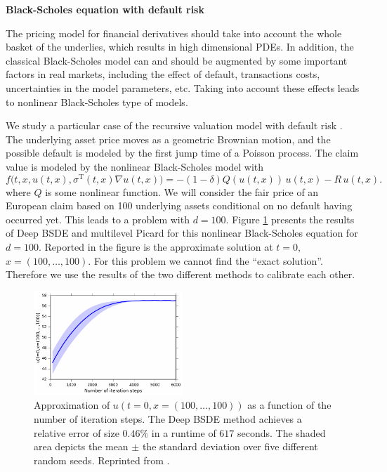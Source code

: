 \documentclass[12pt]{article}
\theoremstyle{definition}
\begin{document}
\vspace{.1in}
\noindent
{\bf Black-Scholes equation with default risk}

 The pricing model for financial derivatives  should take into account the whole basket of the underlies, which results in high dimensional PDEs.  In addition, 
the classical Black-Scholes model can and should be augmented by some important factors in real markets, including the 
 effect of default, transactions costs, uncertainties in the model parameters, etc.
 Taking into account these effects leads to nonlinear Black-Scholes type of models.
%

  We study a particular case of the recursive valuation model with default risk \cite{Duffie1996, Bender2017}. 
 The underlying asset price moves as a geometric Brownian motion, and the possible default is modeled by the first jump time of a Poisson process.
 The claim value is modeled by the nonlinear Black-Scholes model with
    \begin{equation}
      f\big( t, x, u(t,x), \sigma^{\operatorname{T}}( t, x ) \nabla u( t, x ) \big)
      = - \left( 1 - \delta \right) Q( u(t,x) ) \, u(t,x) - R \, u(t,x).
    \end{equation}
where $Q$ is some nonlinear function. %
We will consider the fair price of an European claim based on 100 underlying assets
    conditional on no default having occurred yet.  This leads to a problem with $d=100$.
Figure \ref{fig:BlackScholes} presents the results of Deep BSDE and multilevel Picard for this nonlinear Black-Scholes equation
for $d=100$.
Reported in the figure is the approximate solution at $t=0, $ $x=(100,\dots, 100)$.
For this problem we cannot find the ``exact solution''. Therefore we use the results of the two different methods to
calibrate each other.
%
\begin{figure}[H]
  \centering
  \includegraphics[width=0.5\textwidth]{./figs/PricingDefaultRisk_d100_uinit}
  \caption{Approximation of $u(t{=}0,x{=}(100,\dots,100))$ as a function of the  number of iteration steps.
  The Deep BSDE method achieves a relative error of size $ 0.46\% $ in a runtime of $ 617 $ seconds.
  The shaded area depicts the mean $\pm$ the standard deviation over five different random seeds. 
  Reprinted from \cite{HanJentzenE2018}.
  }
  \label{fig:BlackScholes}
  \end{figure}
  
\end{document}
